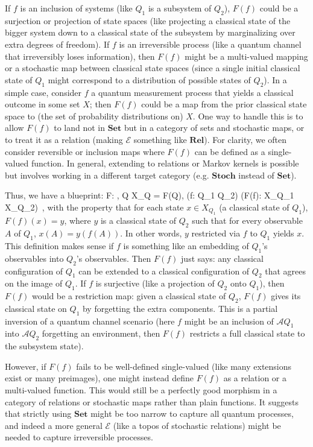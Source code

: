 If $f$ is an inclusion of systems (like $Q_1$ is a subsystem of $Q_2$), $F(f)$ could be a surjection or projection of state spaces (like projecting a classical state of the bigger system down to a classical state of the subsystem by marginalizing over extra degrees of freedom). If $f$ is an irreversible process (like a quantum channel that irreversibly loses information), then $F(f)$ might be a multi-valued mapping or a stochastic map between classical state spaces (since a single initial classical state of $Q_1$ might correspond to a distribution of possible states of $Q_2$). In a simple case, consider $f$ a quantum measurement process that yields a classical outcome in some set $X$; then $F(f)$ could be a map from the prior classical state space to (the set of probability distributions on) $X$. One way to handle this is to allow $F(f)$ to land not in $\mathbf{Set}$ but in a category of sets and stochastic maps, or to treat it as a relation (making $\mathcal{E}$ something like $\mathbf{Rel}$). For clarity, we often consider reversible or inclusion maps where $F(f)$ can be defined as a single-valued function. In general, extending to relations or Markov kernels is possible but involves working in a different target category (e.g. $\mathbf{Stoch}$ instead of $\mathbf{Set}$).

Thus, we have a blueprint:
F:  \to {}, \quad Q \mapsto X_Q = F(Q), \quad (f: Q_1 \to Q_2) \mapsto (F(f): X_{Q_1} \to X_{Q_2})~,
with the property that for each state $x \in X_{Q_1}$ (a classical state of $Q_1$), $F(f)(x) = y$, where $y$ is a classical state of $Q_2$ such that for every observable $A$ of $Q_1$, $x(A) = y(f(A))$. In other words, $y$ restricted via $f$ to $Q_1$ yields $x$. This definition makes sense if $f$ is something like an embedding of $Q_1$’s observables into $Q_2$’s observables. Then $F(f)$ just says: any classical configuration of $Q_1$ can be extended to a classical configuration of $Q_2$ that agrees on the image of $Q_1$. If $f$ is surjective (like a projection of $Q_2$ onto $Q_1$), then $F(f)$ would be a restriction map: given a classical state of $Q_2$, $F(f)$ gives its classical state on $Q_1$ by forgetting the extra components. This is a partial inversion of a quantum channel scenario (here $f$ might be an inclusion of $\mathcal{A}{Q_1}$ into $\mathcal{A}{Q_2}$ forgetting an environment, then $F(f)$ restricts a full classical state to the subsystem state).

However, if $F(f)$ fails to be well-defined single-valued (like many extensions exist or many preimages), one might instead define $F(f)$ as a relation or a multi-valued function. This would still be a perfectly good morphism in a category of relations or stochastic maps rather than plain functions. It suggests that strictly using $\mathbf{Set}$ might be too narrow to capture all quantum processes, and indeed a more general $\mathcal{E}$ (like a topos of stochastic relations) might be needed to capture irreversible processes.

